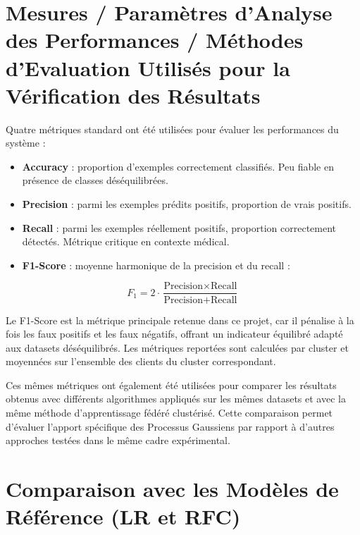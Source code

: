 \documentclass[12pt,a4paper]{article}
\begin{document}

\section{Mesures / Paramètres d'Analyse des Performances / Méthodes d'Evaluation Utilisés pour la Vérification des Résultats}

Quatre métriques standard ont été utilisées pour évaluer les performances du système :

\begin{itemize}
  \item \textbf{Accuracy} : proportion d'exemples correctement classifiés. Peu fiable en présence de classes déséquilibrées.
  \item \textbf{Precision} : parmi les exemples prédits positifs, proportion de vrais positifs.
  \item \textbf{Recall} : parmi les exemples réellement positifs, proportion correctement détectés. Métrique critique en contexte médical.
  \item \textbf{F1-Score} : moyenne harmonique de la precision et du recall :
\end{itemize}

\begin{equation}
F_1 = 2 \cdot \frac{\text{Precision} \times \text{Recall}}{\text{Precision} + \text{Recall}}
\end{equation}

Le F1-Score est la métrique principale retenue dans ce projet, car il pénalise à la fois les faux positifs et les faux négatifs, offrant un indicateur équilibré adapté aux datasets déséquilibrés. Les métriques reportées sont calculées par cluster et moyennées sur l'ensemble des clients du cluster correspondant.

Ces mêmes métriques ont également été utilisées pour comparer les résultats obtenus avec différents algorithmes appliqués sur les mêmes datasets et avec la même méthode d'apprentissage fédéré clustérisé. Cette comparaison permet d'évaluer l'apport spécifique des Processus Gaussiens par rapport à d'autres approches testées dans le même cadre expérimental.


\section{Comparaison avec les Modèles de Référence (LR et RFC)}
\end{document}
